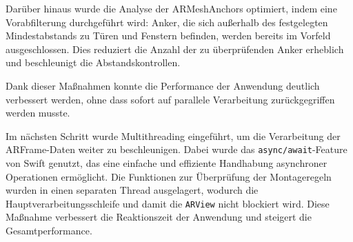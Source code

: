 Darüber hinaus wurde die Analyse der ARMeshAnchors optimiert, indem eine Vorabfilterung durchgeführt wird: Anker, die sich außerhalb des festgelegten Mindestabstands zu Türen und Fenstern befinden, werden bereits im Vorfeld ausgeschlossen. Dies reduziert die Anzahl der zu überprüfenden Anker erheblich und beschleunigt die Abstandskontrollen.

Dank dieser Maßnahmen konnte die Performance der Anwendung deutlich verbessert werden, ohne dass sofort auf parallele Verarbeitung zurückgegriffen werden musste.

Im nächsten Schritt wurde Multithreading eingeführt, um die Verarbeitung der ARFrame-Daten weiter zu beschleunigen. Dabei wurde das \texttt{async/await}-Feature von Swift genutzt, das eine einfache und effiziente Handhabung asynchroner Operationen ermöglicht. Die Funktionen zur Überprüfung der Montageregeln wurden in einen separaten Thread ausgelagert, wodurch die Hauptverarbeitungsschleife und damit die \texttt{ARView} nicht blockiert wird. Diese Maßnahme verbessert die Reaktionszeit der Anwendung und steigert die Gesamtperformance.